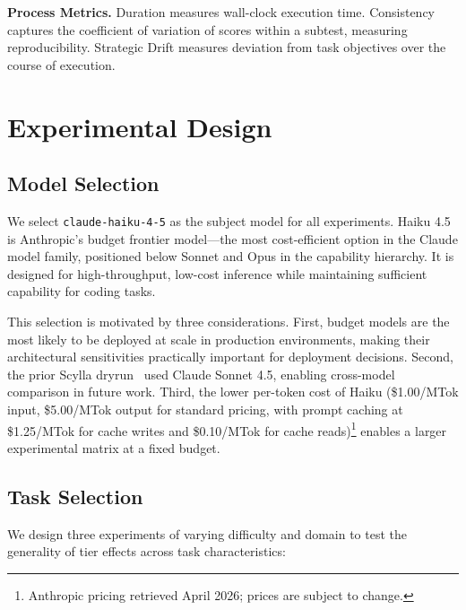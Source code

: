 \documentclass[11pt]{article}
\begin{document}
\textbf{Process Metrics.} Duration measures wall-clock execution time.
Consistency captures the coefficient of variation of scores within a subtest,
measuring reproducibility. Strategic Drift measures deviation from task
objectives over the course of execution.

\section{Experimental Design}
\label{sec:experimental_design}

\subsection{Model Selection}
\label{sec:model_selection}

We select \texttt{claude-haiku-4-5} as the subject model for all experiments.
Haiku 4.5 is Anthropic's budget frontier model---the most cost-efficient
option in the Claude model family, positioned below Sonnet and Opus in the
capability hierarchy. It is designed for high-throughput, low-cost inference
while maintaining sufficient capability for coding tasks.

This selection is motivated by three considerations. First, budget models are
the most likely to be deployed at scale in production environments, making
their architectural sensitivities practically important for deployment
decisions. Second, the prior Scylla dryrun~\cite{scylla2026dryrun} used Claude
Sonnet 4.5, enabling cross-model comparison in future work. Third, the lower
per-token cost of Haiku (\$1.00/MTok input, \$5.00/MTok output for standard
pricing, with prompt caching at \$1.25/MTok for cache writes and \$0.10/MTok
for cache reads)\footnote{Anthropic pricing retrieved April 2026;
prices are subject to change.} enables a larger experimental matrix at a fixed budget.

\subsection{Task Selection}
\label{sec:task_selection}

We design three experiments of varying difficulty and domain to test the
generality of tier effects across task characteristics:
\end{document}
